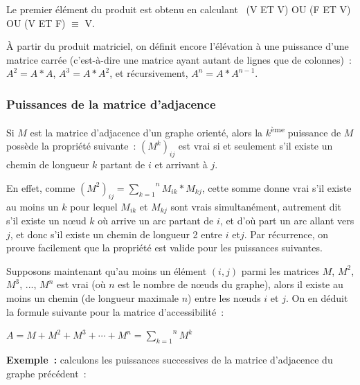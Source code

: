 			Le premier élément du produit est obtenu en calculant \
			(V ET V) OU (F ET V) OU (V ET F) ${\equiv}$ V.

			À partir du produit matriciel, on définit encore l'élévation 
			à une puissance d'une matrice carrée (c'est-à-dire une
			matrice ayant autant de lignes que de colonnes)~: 
			$A^2 = A*A$, $A^3 = A*A^2$, et récursivement, $A^n = A*A^{n-1}$.
			
		\subsubsection{Puissances de la matrice d'adjacence}

			Si $M$ est la matrice d'adjacence d'un graphe orienté, 
			alors la $k$\textsuperscript{ème} puissance de
			$M$ possède la propriété suivante~: 
			$(M^k)_{ij}$ est vrai si et seulement s'il existe un chemin de 
			longueur $k$ partant de $i$ et arrivant à $j$.

			En effet, comme $(M^2)_{ij}=\overset n{\underset{k=1}\sum} M_{ik}\ast M_{kj}$, 
			cette somme donne vrai s'il existe au moins un $k$ pour lequel $M_{ik}$ et
			$M_{kj}$ sont vrais simultanément, autrement dit s'il existe un n{\oe}ud
			$k$ où arrive un arc partant de $i$, et d'où part un arc allant vers
			$j$, et donc s'il existe un chemin de longueur 2 entre $i$ et$j$. 
			Par récurrence, on prouve facilement que la propriété
			est valide pour les puissances suivantes.

			Supposons maintenant qu'au moins un élément $(i, j)$ 
			parmi les matrices $M$, $M^2$, $M^3$, ..., $M^n$ est vrai
			(où $n$ est le nombre de n{\oe}uds du graphe), 
			alors il existe au moins un chemin (de longueur maximale $n$) 
			entre les n{\oe}uds $i$ et $j$. On en déduit la formule suivante 
			pour la matrice	d'accessibilité~:

			\begin{center}
			$A=M+M^2+M^3+\cdots +M^n=\overset n{\underset{k=1}{\sum }}M^k$
			\end{center}
			
			\textbf{Exemple~:} calculons les puissances successives 
			de la matrice d'adjacence du graphe précédent~:

